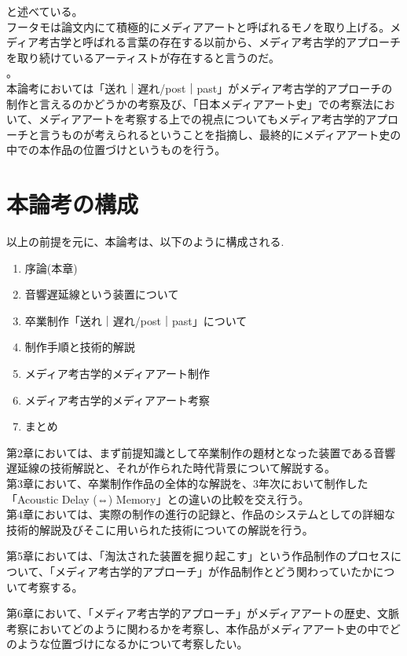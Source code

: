 と述べている。\\
フータモは論文内にて積極的にメディアアートと呼ばれるモノを取り上げる\autocite{huhtamo:mediaarcheology}。メディア考古学と呼ばれる言葉の存在する以前から、メディア考古学的アプローチを取り続けているアーティストが存在すると言うのだ。\\
。\\
本論考においては「送れ｜遅れ/post｜past」がメディア考古学的アプローチの制作と言えるのかどうかの考察及び、「日本メディアアート史」での考察法において、メディアアートを考察する上での視点についてもメディア考古学的アプローチと言うものが考えられるということを指摘し、最終的にメディアアート史の中での本作品の位置づけというものを行う。

\section{本論考の構成}\label{ux672cux8ad6ux8003ux306eux69cbux6210}

以上の前提を元に、本論考は、以下のように構成される.

\begin{enumerate}
\def\labelenumi{\arabic{enumi}.}
\tightlist
\item
  序論(本章)
\item
  音響遅延線という装置について
\item
  卒業制作「送れ｜遅れ/post｜past」について
\item
  制作手順と技術的解説
\item
  メディア考古学的メディアアート制作
\item
  メディア考古学的メディアアート考察
\item
  まとめ
\end{enumerate}

第2章においては、まず前提知識として卒業制作の題材となった装置である音響遅延線の技術解説と、それが作られた時代背景について解説する。\\
第3章において、卒業制作作品の全体的な解説を、3年次において制作した「Acoustic
Delay (⇔) Memory」との違いの比較を交え行う。\\
第4章においては、実際の制作の進行の記録と、作品のシステムとしての詳細な技術的解説及びそこに用いられた技術についての解説を行う。

第5章においては、「淘汰された装置を掘り起こす」という作品制作のプロセスについて、「メディア考古学的アプローチ」が作品制作とどう関わっていたかについて考察する。

第6章において、「メディア考古学的アプローチ」がメディアアートの歴史、文脈考察においてどのように関わるかを考察し、本作品がメディアアート史の中でどのような位置づけになるかについて考察したい。


